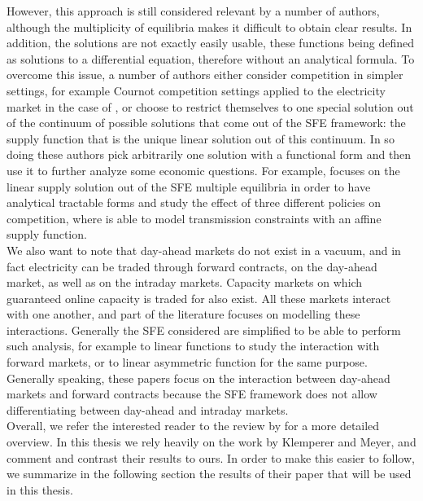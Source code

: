 However, this approach is still considered relevant by a number of authors, although the multiplicity of equilibria makes it difficult to obtain clear results. In addition, the solutions are not exactly easily usable, these functions being defined as solutions to a differential equation, therefore without an analytical formula. To overcome this issue, a number of authors either consider competition in simpler settings, for example Cournot competition settings applied to the electricity market in the case of \cite{borenstein1999empirical}, or choose to restrict themselves to one special solution out of the continuum of possible solutions that come out of the SFE framework: the supply function that is the unique linear solution out of this continuum. In so doing these authors pick arbitrarily one solution with a functional form and then use it to further analyze some economic questions. For example, \cite{green1996increasing} focuses on the linear supply solution out of the SFE multiple equilibria in order to have analytical tractable forms and study the effect of three different policies on competition, where 
\cite{hobbs2000strategic} is able to model transmission constraints with an affine supply function.\\

We also want to note that day-ahead markets do not exist in a vacuum, and in fact electricity can be traded through forward contracts, on the day-ahead market, as well as on the intraday markets. Capacity markets on which guaranteed online capacity is traded for also exist. All these markets interact with one another, and part of the literature focuses on modelling these interactions. Generally the SFE considered are simplified to be able to perform such analysis, for example to linear functions \cite{green1999electricity} to study the interaction with forward markets, or to linear asymmetric function \cite{anderson2012asymmetric} for the same purpose. Generally speaking, these papers focus on the interaction between day-ahead markets and forward contracts because the SFE framework does not allow differentiating between day-ahead and intraday markets. \\

Overall, we refer the interested reader to the review by \cite{ventosa2005electricity} for a more detailed overview. In this thesis we rely heavily on the work by Klemperer and Meyer, and comment and contrast their results to ours. In order to make this easier to follow, we summarize in the following section the results of their paper that will be used in this thesis.

